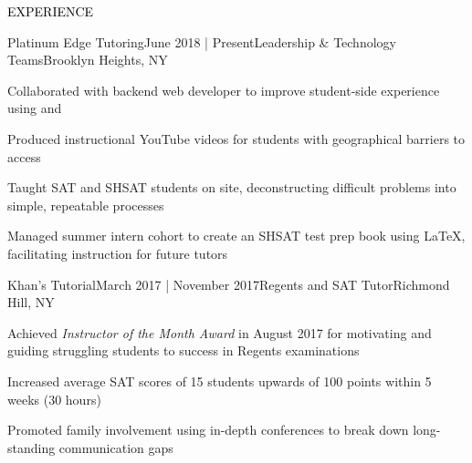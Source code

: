 \documentclass{resume} %
\renewenvironment{rSection}[1]{
  \sectionskip
  \textcolor{Black}{\MakeUppercase{#1}}
  \sectionlineskip
  \begin{list}{}{
      \setlength{\leftmargin}{1.5em}
    }
  \item[]
  }{
  \end{list}
}
\begin{document}
\begin{rSection}{Experience}
  \begin{rSubsection}{Platinum Edge Tutoring}{June 2018 | Present}{Leadership \& Technology Teams}{Brooklyn Heights, NY}
    \item Collaborated with backend web developer to improve student-side
      experience using  and 
    \item Produced instructional YouTube videos for students with geographical
      barriers to access
    \item Taught SAT and SHSAT students on site, deconstructing difficult problems
      into simple, repeatable processes
    \item Managed summer intern cohort to create an SHSAT test prep book
      using \LaTeX, facilitating instruction for future tutors
  \end{rSubsection}
  \begin{rSubsection}{Khan's Tutorial}{March 2017 | November 2017}{Regents and SAT Tutor}{Richmond Hill, NY}
    \item Achieved {\em Instructor of the Month Award} in August 2017 for motivating and guiding struggling students to success in Regents examinations
    \item Increased average SAT scores of 15 students upwards of 100 points within 5 weeks (30 hours)
    \item Promoted family involvement using in-depth conferences to break down long-standing communication gaps
  \end{rSubsection}


\end{rSection}
\end{document}
